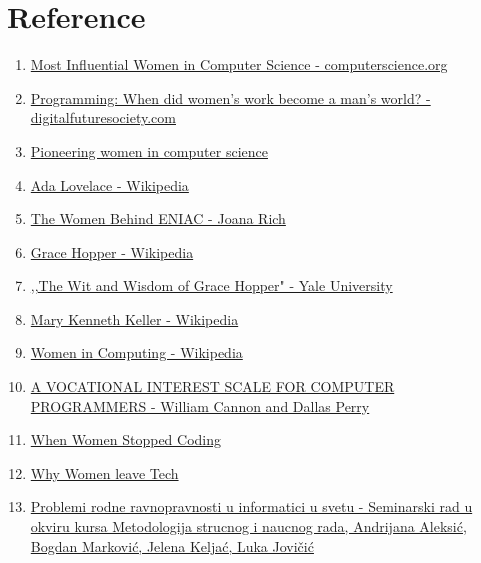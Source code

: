 \documentclass[12pt]{article}
\begin{document}
\section*{Reference}
\begin{enumerate}
  \item \href{https://www.computerscience.org/resources/most-influential-women-computer-science}{Most Influential Women in Computer Science - computerscience.org}  
  \item \href{https://digitalfuturesociety.com/programming-when-did-womens-work-become-a-mans-world/}{Programming: When did women's work become a man's world? - digitalfuturesociety.com} 
  \item  \href{https://dl.acm.org/doi/abs/10.1145/543812.543853}{Pioneering women in computer science}
  \item  \href{https://en.wikipedia.org/wiki/Ada_Lovelace#First_published_computer_program}{Ada Lovelace - Wikipedia}
  \item  \href{https://spectrum.ieee.org/the-women-behind-eniac}{The Women Behind ENIAC - Joana Rich}
  \item  \href{https://en.wikipedia.org/wiki/Grace_Hopper#World_War_II}{Grace Hopper - Wikipedia}
  \item  \href{https://www.cs.yale.edu/homes/tap/Files/hopper-wit.html}{,,The Wit and Wisdom of Grace Hopper" - Yale University}
  \item  \href{https://en.wikipedia.org/wiki/Mary_Kenneth_Keller}{Mary Kenneth Keller - Wikipedia}
  \item  \href{https://en.wikipedia.org/wiki/Women_in_computing}{Women in Computing - Wikipedia}
  \item  \href{https://dl.acm.org/doi/pdf/10.1145/1142620.1142628}{A VOCATIONAL INTEREST SCALE FOR
COMPUTER PROGRAMMERS - William Cannon and Dallas Perry}
\item
  \href{https://www.npr.org/sections/money/2014/10/21/357629765/when-women-stopped-coding}{When Women Stopped Coding}
  \item  \href{https://www.womenintech.co.uk/6-reasons-why-so-many-women-leave-tech-jobs/#:~:text=A%20staggering%2056%25%20of%20women,this%20percentage%20will%20only%20decrease.}{Why Women leave Tech}
  \item  \href{http://ns2.matf.bg.ac.rs/~milena/msnr/2022/finalne_verzije/03_ProblemiRodneRavnopravnostiUInformaticiUSvetu_AleksicMarkovicKeljacJovicic.pdf}{Problemi rodne ravnopravnosti u informatici u svetu - Seminarski rad u okviru kursa Metodologija strucnog i naucnog rada, Andrijana Aleksić, Bogdan Marković, Jelena Keljać, Luka Jovičić}
  

\end{enumerate}
\end{document}
